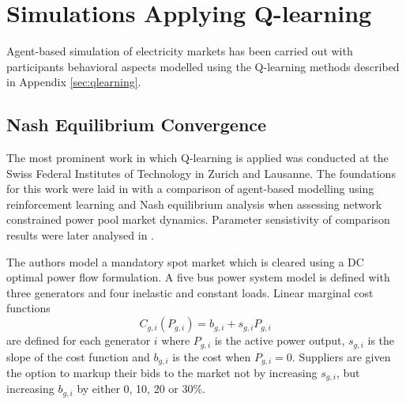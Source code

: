 \section{Simulations Applying Q-learning}
%
Agent-based simulation of electricity markets has been carried out with
participants behavioral aspects modelled using the Q-learning methods
described in Appendix \ref{sec:qlearning}.

\subsection{Nash Equilibrium Convergence}
The most prominent work in which Q-learning is applied was conducted
at the Swiss Federal Institutes of Technology in Zurich and Lausanne. The
foundations for this work were laid in \cite{krause:nash04} with a comparison
of agent-based modelling using reinforcement learning and Nash equilibrium
analysis when assessing network constrained power pool market dynamics.
Parameter sensistivity of comparison results were later analysed in
\cite{krause:nash06}.

The authors model a mandatory spot market which is cleared using a DC
optimal power flow formulation.  A five bus power system model is defined with
three generators and four inelastic and constant loads.  Linear marginal cost
functions
\begin{equation}
C_{g,i}(P_{g,i}) = b_{g,i} + s_{g,i}P_{g,i}
\end{equation}
are defined for each generator $i$ where $P_{g,i}$ is the active power output,
$s_{g,i}$ is the slope of the cost function and $b_{g,i}$ is the cost when
$P_{g,i} = 0$.  Suppliers are given the option to markup their bids to the
market not by increasing $s_{g,i}$, but increasing $b_{g,i}$ by either 0,
10, 20 or 30\%.

